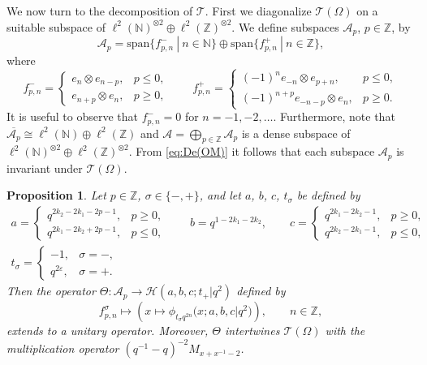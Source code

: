 \documentclass[11pt]{article}
\newtheorem{proposition}{Proposition}
\numberwithin{equation}{section}
\numberwithin{theorem}{section}
\numberwithin{proposition}{section}
\numberwithin{lemma}{section}
\numberwithin{corollary}{section}
\numberwithin{definition}{section}
\numberwithin{example}{section}
\numberwithin{remark}{section}
\numberwithin{note}{section}
\newcommand{\N}{\mathbb N}
\newcommand{\Z}{\mathbb Z}
\newcommand{\eps}{\varepsilon}
\begin{document}
We now turn to the decomposition of $\mathcal T$. First we diagonalize $\mathcal T(\Omega)$ on a suitable subspace of $\ell^2(\N)^{\otimes 2} \oplus \ell^2(\Z)^{\otimes 2}$. We def\/ine subspaces $\mathcal A_p$, $p\in\Z$, by
\[
\mathcal A_p =  \mathrm{span}\{f_{p,n}^-\ | \ n\in \N\}  \oplus  \mathrm{span} \{f_{p,n}^+\ | \ n \in \Z \},
\]
where
\[
f_{p,n}^- = \begin{cases}
e_n \otimes e_{n-p}, & p \leq 0,\\
e_{n+p} \otimes e_n, & p \geq 0,
\end{cases}
 \qquad
f_{p,n}^+=
\begin{cases}
(-1)^n e_{-n} \otimes e_{p+n}, & p \leq 0,\\
(-1)^{n+p} e_{-n-p} \otimes e_n, & p \geq 0.
\end{cases}
\]
It is useful to observe that $f_{p,n}^-=0$ for $n=-1,-2,\ldots$. Furthermore, note that $\overline{\mathcal A_p} \cong \ell^2(\N) \oplus \ell^2(\Z)$ and $\mathcal A = \bigoplus_{p \in \Z} \mathcal A_p$ is a dense subspace of $\ell^2(\N)^{\otimes 2} \oplus \ell^2(\Z)^{\otimes 2}$. From \eqref{eq:De(OM)} it follows that each subspace $\mathcal A_p$ is invariant under $\mathcal T(\Omega)$.

\begin{proposition} \label{prop:Te}
Let $p \in \Z$, $\sigma \in \{-,+\}$, and let $a$, $b$, $c$, $t_\sigma$ be defined by
\begin{gather}
a= \begin{cases}
q^{2k_2-2k_1-2p-1}, & p \geq 0,\\
q^{2k_1-2k_2+2p-1}, & p \leq 0,
\end{cases}
 \qquad b = q^{1-2k_1-2k_2}, \qquad
c=\begin{cases}
q^{2k_1-2k_2-1}, & p \geq 0,\\
q^{2k_2-2k_1-1}, & p \leq 0,
\end{cases}
\nonumber\\  t_\sigma =
\begin{cases}
-1, & \sigma=-,\\
q^{2\eps}, & \sigma=+.
\end{cases}\label{eq:abct}
\end{gather}
Then the operator $\Theta:\mathcal A_p \rightarrow \mathcal H(a,b,c;t_+|q^2)$ defined by
\[
f_{p,n}^\sigma \mapsto \left(x\mapsto \phi_{t_\sigma q^{2n}}\big(x;a,b,c|q^2\big) \right), \qquad n \in \Z,
\]
extends to a unitary operator. Moreover, $\Theta$ intertwines $\mathcal T(\Omega)$ with the multiplication operator $(q^{-1}-q)^{-2}M_{x+x^{-1}-2}$.
\end{proposition}
\end{document}
